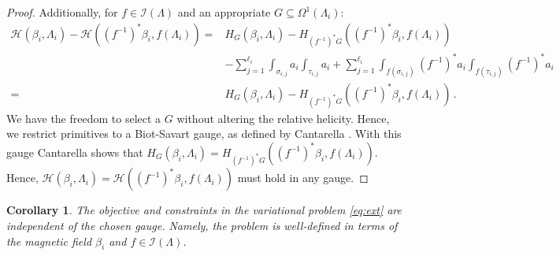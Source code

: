 \documentclass[11pt]{article}
\theoremstyle{plain}
\newtheorem{corollary}[theorem]{Corollary}
\theoremstyle{definition}
\theoremstyle{remark}
\newcommand{\ST}{\Lambda}
\newcommand{\I}{\mathcal{I}(\ST)}
\begin{document}
\begin{proof}
Additionally, for \(f \in \I\) and an appropriate \(G \subseteq \Omega^1(\ST_i)\): 
\begin{align*}
\mathscr{H}( \beta_i, \ST_i ) - \mathscr{H}( (f^{-1})^* \beta_i, f(\ST_i ) ) = &H_G( \beta_i, \ST_i ) - H_{(f^{-1})^* G}( (f^{-1})^* \beta_i, f(\ST_i ) )  \\
&- \sum_{j=1}^{\ell_i} \int_{\sigma_{i,j}} a_i \int_{\tau_{i,j}}  a_i
 +
 \sum_{j=1}^{\ell_i} \int_{f(\sigma_{i,j})} (f^{-1})^*a_i \int_{f(\tau_{i,j})} (f^{-1})^* a_i
 \\
 = &H_G( \beta_i, \ST_i ) - H_{(f^{-1})^* G}( (f^{-1})^* \beta_i, f(\ST_i ) ) 
 \,  .
\end{align*}
We have the freedom to select a \(G\) without altering the relative helicity. Hence, we restrict primitives to a Biot-Savart gauge, as defined by Cantarella \cite{CANTARELLA20101127}. With this gauge Cantarella shows that \(H_G( \beta_i, \ST_i ) = H_{(f^{-1})^* G}( (f^{-1})^* \beta_i, f(\ST_i ) ) \). Hence, \(\mathscr{H}( \beta_i, \ST_i ) = \mathscr{H}( (f^{-1})^* \beta_i, f(\ST_i ) )\) must hold in any gauge.
\end{proof}



\begin{corollary}
    The objective and constraints in the variational problem \eqref{eq:ext} are independent of the chosen gauge. Namely, the problem is well-defined in terms of the magnetic field \(\beta_i\) and \(f \in \I\). 
\end{corollary}
\end{document}
